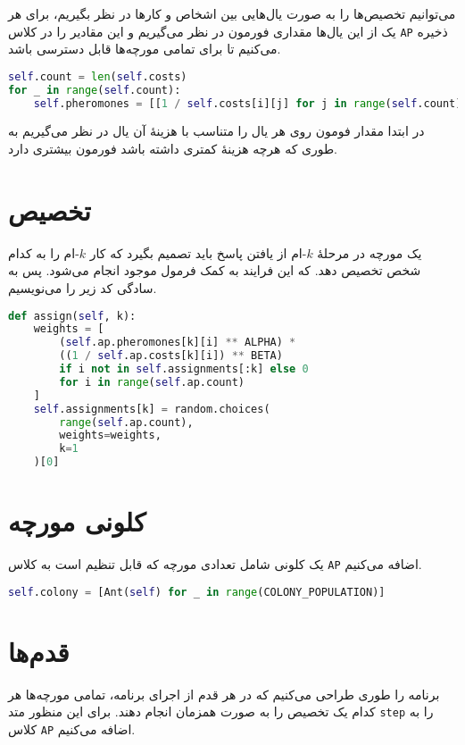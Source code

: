 \documentclass[a4paper, 12pt]{article}
\theoremstyle{definition}
\begin{document}
می‌توانیم تخصیص‌ها را به صورت یال‌هایی بین اشخاص و کارها در نظر بگیریم، برای هر یک از این یال‌ها مقداری فورمون در نظر می‌گیریم و این مقادیر را در کلاس
\texttt{AP}
ذخیره می‌کنیم تا برای تمامی مورچه‌ها قابل دسترسی باشد.

\LTR
\begin{lstlisting}[language=Python]
self.count = len(self.costs)
for _ in range(self.count):
    self.pheromones = [[1 / self.costs[i][j] for j in range(self.count)] for i in range(self.count)]
\end{lstlisting}
\RTL

در ابتدا مقدار فومون روی هر یال را متناسب با هزینهٔ آن یال در نظر می‌گیریم به طوری که هرچه هزینهٔ کمتری داشته باشد فورمون بیشتری دارد.

\section{تخصیص}

یک مورچه در مرحلهٔ
$k$-ام
از یافتن پاسخ باید تصمیم بگیرد که کار
$k$-ام
را به کدام شخص تخصیص دهد. که این فرایند به کمک فرمول موجود انجام می‌شود. پس به سادگی کد زیر را می‌نویسیم.

\LTR
\begin{lstlisting}[language=Python]
def assign(self, k):
    weights = [
        (self.ap.pheromones[k][i] ** ALPHA) *
        ((1 / self.ap.costs[k][i]) ** BETA)
        if i not in self.assignments[:k] else 0
        for i in range(self.ap.count)
    ]
    self.assignments[k] = random.choices(
        range(self.ap.count),
        weights=weights,
        k=1
    )[0]
\end{lstlisting}
\RTL

\section{کلونی مورچه}

یک کلونی شامل تعدادی مورچه که قابل تنظیم است به کلاس
\texttt{AP}
اضافه می‌کنیم.

\LTR
\begin{lstlisting}[language=Python]
self.colony = [Ant(self) for _ in range(COLONY_POPULATION)]
\end{lstlisting}
\RTL

\section{قدم‌ها}

برنامه را طوری طراحی می‌کنیم که در هر قدم از اجرای برنامه، تمامی مورچه‌ها هر کدام یک تخصیص را به صورت همزمان انجام دهند. برای این منظور متد
\texttt{step}
را به کلاس
\texttt{AP}
اضافه می‌کنیم.
\end{document}
